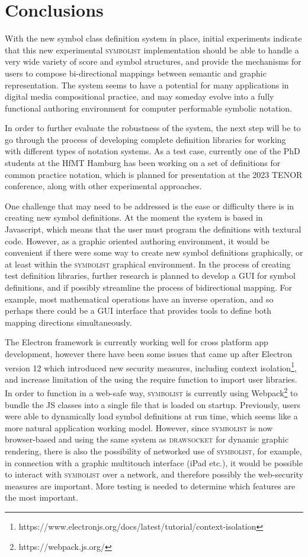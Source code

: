 \documentclass{article}
\def\symbolist{\textsc{symbolist}\xspace}
\def\drawsocket{\textsc{drawsocket}\xspace}
\begin{document}
\section{Conclusions} %
 
With the new symbol class definition system in place, initial experiments indicate that this new experimental \symbolist implementation should be able to handle a very wide variety of score and symbol structures, and provide the mechanisms for users to compose bi-directional mappings between semantic and graphic representation.
The system seems to have a potential for many applications in digital media compositional practice, and may someday evolve into a fully functional authoring environment for computer performable symbolic notation.

In order to further evaluate the robustness of the system, the next step will be to go through the process of developing complete definition libraries for working with different types of notation systems. As a test case, currently one of the PhD students at the HfMT Hamburg has been working on a set of definitions for common practice notation, which is planned for presentation at the 2023 TENOR conference, along with other experimental approaches.

One challenge that may need to be addressed is the ease or difficulty there is in creating new symbol definitions. At the moment the system is based in Javascript, which means that the user must program the definitions with textural code. However, as a graphic oriented authoring environment, it would be convenient if there were some way to create new symbol definitions graphically, or at least within the \symbolist graphical environment. 
In the process of creating test definition libraries, further research is planned to develop a GUI for symbol definitions, and if possibly streamline the process of bidirectional mapping. For example, most mathematical operations have an inverse operation, and so perhaps there could be a GUI interface that provides tools to define both mapping directions simultaneously.

The Electron framework is currently working well for cross platform app development, however there have been some issues that came up after Electron version 12 which introduced new security measures, including context isolation\footnote{https://www.electronjs.org/docs/latest/tutorial/context-isolation}, and increase limitation of the using the require function to import user libraries. In order to function in a web-safe way, \symbolist is currently using Webpack\footnote{https://webpack.js.org/} to bundle the JS classes into a single file that is loaded on startup. Previously, users were able to dynamically load symbol definitions at run time, which seems like a more natural application working model. 
However, since \symbolist is now browser-based and using the same system as \drawsocket for dynamic graphic rendering, there is also the possibility of networked use of \symbolist, for example, in connection with a graphic multitouch interface (iPad etc.), it would be possible to interact with \symbolist over a network, and therefore possibly the web-security measures are important. 
More testing is needed to determine which features are the most important.
\end{document}
